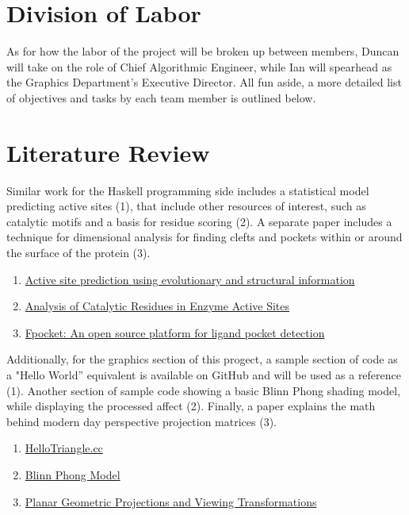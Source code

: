 \documentclass[12pt]{article}
\begin{document}
	\section*{Division of Labor}

	As for how the labor of the project will be broken up between members, 
	Duncan will take on the role of Chief Algorithmic Engineer, while Ian will
	spearhead as the Graphics Department's Executive Director. All fun aside,
	a more detailed list of objectives and tasks by each team member is outlined 
	below.

	\section*{Literature Review}

	Similar work for the Haskell programming side includes a statistical model
	predicting active sites (1), that include other resources of interest, such as
	catalytic motifs and a basis for residue scoring (2). A separate paper includes
	a technique for dimensional analysis for finding clefts and pockets within
	or around the surface of the protein (3).

	\begin{enumerate}[noitemsep]
		\item \href{https://pubmed.ncbi.nlm.nih.gov/20080507/}{Active site prediction using evolutionary and structural information}
	\item \href{https://www.sciencedirect.com/science/article/pii/S0022283602010367}{Analysis of Catalytic Residues in Enzyme Active Sites}
	\item \href{https://pmc.ncbi.nlm.nih.gov/articles/PMC2700099/}{Fpocket: An open source platform for ligand pocket detection}
	\end{enumerate}
	
	Additionally, for the graphics section of this progect, a sample section of
	code as a "Hello World'' equivalent is available on GitHub and will be used
	as a reference (1). Another section of sample code showing a basic Blinn 
	Phong shading model, while displaying the processed affect (2). Finally, a
	paper explains the math behind modern day perspective projection matrices (3).

	\begin{enumerate}[noitemsep]
		\item \href{https://gist.github.com/Overv/7ac07356037592a1121225172d7d78f2d}{HelloTriangle.cc}
		\item \href{https://www.shadertoy.com/view/3d3cWN}{Blinn Phong Model}
		\item \href{https://dl.acm.org/doi/pdf/10.1145/356744.356750}{Planar Geometric Projections and Viewing Transformations}
	\end{enumerate}
\end{document}
